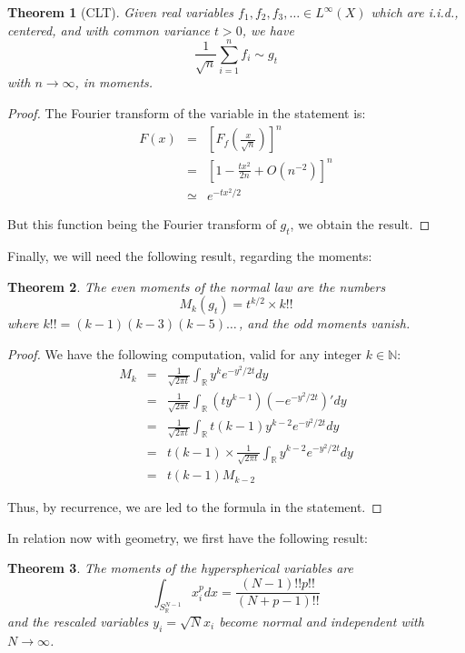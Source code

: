 \documentclass[12pt]{amsbook}
\newtheorem{theorem}{Theorem}[chapter]
\begin{document}
\begin{theorem}[CLT]
Given real variables $f_1,f_2,f_3,\ldots\in L^\infty(X)$ which are i.i.d., centered, and with common variance $t>0$, we have
$$\frac{1}{\sqrt{n}}\sum_{i=1}^nf_i\sim g_t$$
with $n\to\infty$, in moments.
\end{theorem}

\begin{proof}
The Fourier transform of the variable in the statement is:
\begin{eqnarray*}
F(x)
&=&\left[F_f\left(\frac{x}{\sqrt{n}}\right)\right]^n\\
&=&\left[1-\frac{tx^2}{2n}+O(n^{-2})\right]^n\\
&\simeq&e^{-tx^2/2}
\end{eqnarray*}

But this function being the Fourier transform of $g_t$, we obtain the result.
\end{proof}

Finally, we will need the following result, regarding the moments:

\begin{theorem}
The even moments of the normal law are the numbers
$$M_k(g_t)=t^{k/2}\times k!!$$
where $k!!=(k-1)(k-3)(k-5)\ldots\,$, and the odd moments vanish. 
\end{theorem}

\begin{proof}
We have the following computation, valid for any integer $k\in\mathbb N$:
\begin{eqnarray*}
M_k
&=&\frac{1}{\sqrt{2\pi t}}\int_\mathbb Ry^ke^{-y^2/2t}dy\\
&=&\frac{1}{\sqrt{2\pi t}}\int_\mathbb R(ty^{k-1})\left(-e^{-y^2/2t}\right)'dy\\
&=&\frac{1}{\sqrt{2\pi t}}\int_\mathbb Rt(k-1)y^{k-2}e^{-y^2/2t}dy\\
&=&t(k-1)\times\frac{1}{\sqrt{2\pi t}}\int_\mathbb Ry^{k-2}e^{-y^2/2t}dy\\
&=&t(k-1)M_{k-2}
\end{eqnarray*}

Thus, by recurrence, we are led to the formula in the statement.
\end{proof}

In relation now with geometry, we first have the following result:


\begin{theorem}
The moments of the hyperspherical variables are
$$\int_{S^{N-1}_\mathbb R}x_i^pdx=\frac{(N-1)!!p!!}{(N+p-1)!!}$$
and the rescaled variables $y_i=\sqrt{N}x_i$ become normal and independent with $N\to\infty$.
\end{theorem}
\end{document}
